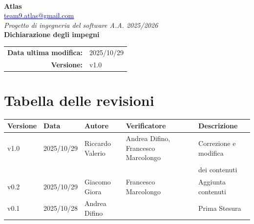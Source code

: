 \documentclass[a4paper,12pt]{article}
\makeatletter
\newcommand{\Gruppo}{Atlas}
\newcommand{\Email}{\href{mailto:team9.atlas@gmail.com}{\textcolor{blue}{\underline{team9.atlas@gmail.com}}}}
\newcommand{\TitoloUno}{Dichiarazione degli impegni}
\newcommand{\DataModifica}{2025/10/29}
\newcommand{\LogoGruppo}{img/AtlasLogo.png} %
\newcommand{\VersioneDocumento}{v1.0} %
\makeatother
\begin{document}
\begin{titlepage}
    \centering

    \vspace*{0cm}
    \\[0.8cm]

    {\LARGE \textbf{\Gruppo}}\\[0.1cm]
    {\large \Email}\\[1.2cm]

    {\Large \textit{Progetto di ingegneria del software A.A. 2025/2026}}\\[1.5cm]

    {\Huge \textbf{\TitoloUno}}\\[.5cm]

    \begin{tabular}{rl}
        \textbf{Data ultima modifica:} & \DataModifica \\
        \textbf{Versione:} & \VersioneDocumento \\
    \end{tabular}

\end{titlepage}


\section*{Tabella delle revisioni}
    \begin{center} 
        \begin{tabular}{|l|l|l|l|l|}
            \hline
            \textbf{Versione} & \textbf{Data} & \textbf{Autore} & \textbf{Verificatore} & \textbf{Descrizione} \\
            \hline
            v1.0 & 2025/10/29 & Riccardo Valerio & Andrea Difino, Francesco Marcolongo & Correzione e modifica\\
            &&&&dei contenuti\\
            \hline
            v0.2 & 2025/10/29 & Giacomo Giora & Francesco Marcolongo & Aggiunta contenuti \\
            \hline
            v0.1 & 2025/10/28 & Andrea Difino & & Prima Stesura \\
            \hline
        \end{tabular}
    \end{center}
\end{document}
